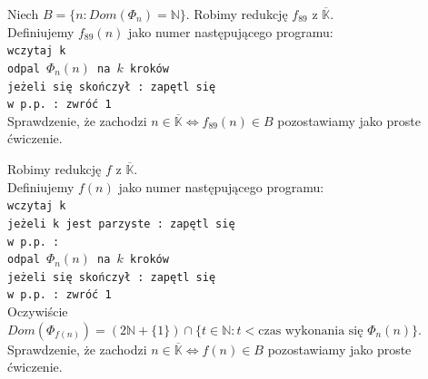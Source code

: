 \documentclass[a4paper,11pt]{article}
\newenvironment{zadanie}[1]
  {\renewcommand\theinnercustomthm{#1}\innercustomthm}
  {\endinnercustomthm}
\begin{document}
\begin{zadanie}{89}
\end{zadanie}
Niech $B = \{ n : Dom(\Phi_n) = \mathbb{N} \}$. Robimy redukcję $f_{89}$ z $\overline{\mathbb{K}}$. \\
Definiujemy $f_{89}(n)$ jako numer następującego programu: \\
\texttt{wczytaj k  \\ odpal $\Phi_n(n)$ na $k$ kroków \\ jeżeli się skończył : zapętl się \\ w p.p. : zwróć 1 \\}
Sprawdzenie, że zachodzi $n \in \overline{\mathbb{K}} \Longleftrightarrow f_{89}(n) \in B$ pozostawiamy jako proste ćwiczenie.



\begin{zadanie}{92}
\end{zadanie}
Robimy redukcję $f$ z $\overline{\mathbb{K}}$. \\
Definiujemy $f(n)$ jako numer następującego programu: \\
\texttt{wczytaj k \\ jeżeli k jest parzyste : zapętl się  \\ w p.p. : \\ odpal $\Phi_n(n)$ na $k$ kroków \\ jeżeli się skończył : zapętl się \\ w p.p. : zwróć 1 \\}
Oczywiście $Dom(\Phi_{f(n)}) = (2\mathbb{N}+\{1\}) \cap \{ t \in \mathbb{N} : t < \text{czas wykonania się } \Phi_n(n) \}$. \\
Sprawdzenie, że zachodzi $n \in \overline{\mathbb{K}} \Longleftrightarrow f(n) \in B$ pozostawiamy jako proste ćwiczenie.
\end{document}
